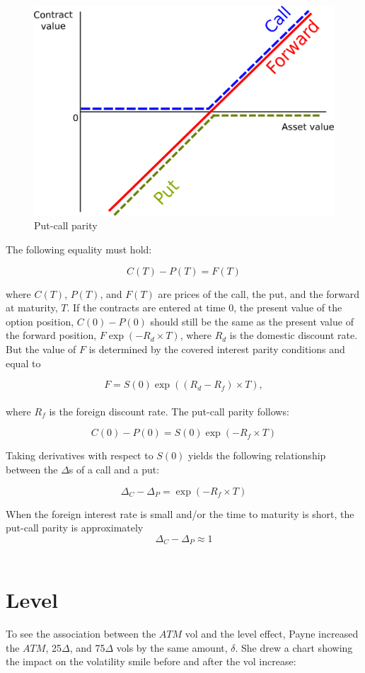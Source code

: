 \documentclass[]{book}
\theoremstyle{definition}
\theoremstyle{definition}
\theoremstyle{definition}
\theoremstyle{remark}
\begin{document}
\begin{figure}
\includegraphics[width=0.6\linewidth]{images/figPutCallParity01} \caption{Put-call parity}\label{fig:unnamed-chunk-26}
\end{figure}

The following equality must hold:

\[
C(T) - P(T) = F(T)
\]

where \(C(T)\), \(P(T)\), and \(F(T)\) are prices of the call, the put,
and the forward at maturity, \(T\). If the contracts are entered at time
0, the present value of the option position, \(C(0) - P(0)\) should
still be the same as the present value of the forward position,
\(F \exp(-R_d \times T)\), where \(R_d\) is the domestic discount rate.
But the value of \(F\) is determined by the covered interest parity
conditions and equal to

\[
F= S(0) \exp((R_d-R_f) \times T ),
\]\\
where \(R_f\) is the foreign discount rate. The put-call parity follows:

\[
C(0) - P(0) = S(0) \exp(-R_f \times T)
\]

Taking derivatives with respect to \(S(0)\) yields the following
relationship between the \(\Delta\)s of a call and a put:

\[
\Delta_C - \Delta_P = \exp(-R_f \times T)
\]

When the foreign interest rate is small and/or the time to maturity is
short, the put-call parity is approximately ~ \[
\Delta_C - \Delta_P \approx 1
\]\\

\section{Level}\label{level}

To see the association between the \(ATM\) vol and the level effect,
Payne increased the \(ATM\), 25\(\Delta\), and 75\(\Delta\) vols by the
same amount, \(\delta\). She drew a chart showing the impact on the
volatility smile before and after the vol increase:
\end{document}
